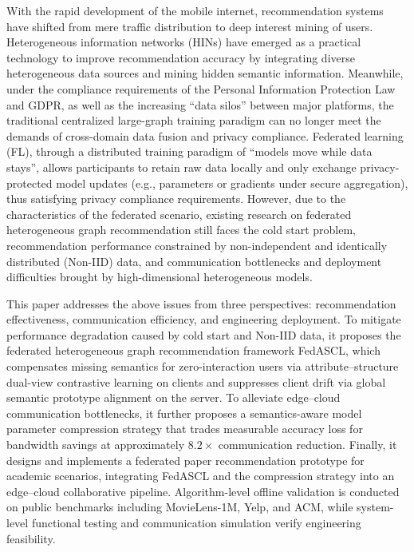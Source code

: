 \begingroup
\rmfamily
\setlength{\parindent}{0pt}
\setlength{\parskip}{0.18\baselineskip plus 0.05\baselineskip minus 0.03\baselineskip}
{\fontsize{12pt}{18pt}\selectfont
\noindent With the rapid development of the mobile internet, recommendation systems have shifted from mere traffic distribution to deep interest mining of users. Heterogeneous information networks (HINs) have emerged as a practical technology to improve recommendation accuracy by integrating diverse heterogeneous data sources and mining hidden semantic information. Meanwhile, under the compliance requirements of the Personal Information Protection Law and GDPR, as well as the increasing ``data silos'' between major platforms, the traditional centralized large-graph training paradigm can no longer meet the demands of cross-domain data fusion and privacy compliance. Federated learning (FL), through a distributed training paradigm of ``models move while data stays'', allows participants to retain raw data locally and only exchange privacy-protected model updates (e.g., parameters or gradients under secure aggregation), thus satisfying privacy compliance requirements. However, due to the characteristics of the federated scenario, existing research on federated heterogeneous graph recommendation still faces the cold start problem, recommendation performance constrained by non-independent and identically distributed (Non-IID) data, and communication bottlenecks and deployment difficulties brought by high-dimensional heterogeneous models.

\noindent This paper addresses the above issues from three perspectives: recommendation effectiveness, communication efficiency, and engineering deployment. To mitigate performance degradation caused by cold start and Non-IID data, it proposes the federated heterogeneous graph recommendation framework FedASCL, which compensates missing semantics for zero-interaction users via attribute--structure dual-view contrastive learning on clients and suppresses client drift via global semantic prototype alignment on the server. To alleviate edge--cloud communication bottlenecks, it further proposes a semantics-aware model parameter compression strategy that trades measurable accuracy loss for bandwidth savings at approximately $8.2\times$ communication reduction. Finally, it designs and implements a federated paper recommendation prototype for academic scenarios, integrating FedASCL and the compression strategy into an edge--cloud collaborative pipeline. Algorithm-level offline validation is conducted on public benchmarks including MovieLens-1M, Yelp, and ACM, while system-level functional testing and communication simulation verify engineering feasibility.

}

